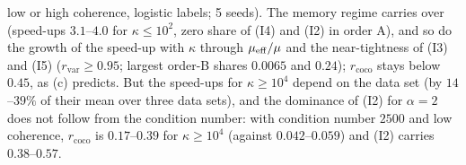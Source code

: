 low or high coherence, logistic labels; 5 seeds). The memory regime carries over (speed-ups $3.1$--$4.0$ for $\kappa\le10^2$, zero share of (I4) and (I2) in order A), and so do the growth of the speed-up with $\kappa$ through $\mu_{\mathrm{eff}}/\mu$ and the near-tightness of (I3) and (I5) ($r_{\mathrm{var}}\ge0.95$; largest order-B shares $0.0065$ and $0.24$); $r_{\mathrm{coco}}$ stays below $0.45$, as (c) predicts. But the speed-ups for $\kappa\ge10^4$ depend on the data set (by $14$--$39\%$ of their mean over three data sets), and the dominance of (I2) for $\alpha=2$ does not follow from the condition number: with condition number $2500$ and low coherence, $r_{\mathrm{coco}}$ is $0.17$--$0.39$ for $\kappa\ge10^4$ (against $0.042$--$0.059$) and (I2) carries $0.38$--$0.57$.
